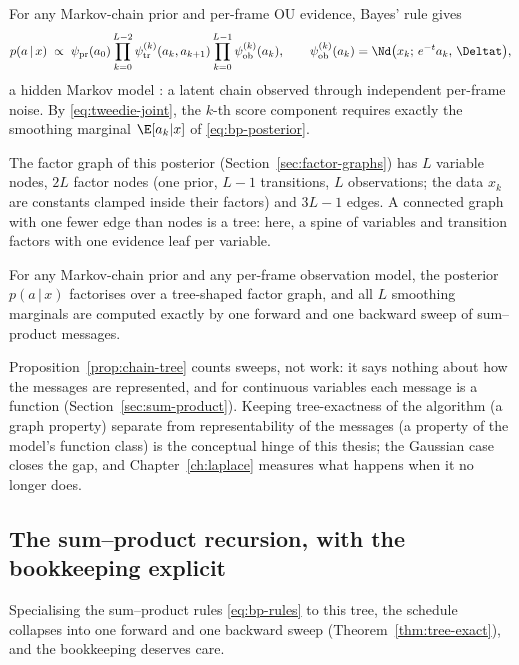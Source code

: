 For any Markov-chain prior and per-frame OU evidence, Bayes' rule gives
\begin{equation}
  p(a \,|\, x) \;\propto\;
  \psi_{\mathrm{pr}}(a_0)
  \prod_{k=0}^{L-2} \psi^{(k)}_{\mathrm{tr}}(a_k, a_{k+1})
  \prod_{k=0}^{L-1} \psi^{(k)}_{\mathrm{ob}}(a_k),
  \qquad
  \psi^{(k)}_{\mathrm{ob}}(a_k) = \Nd\big(x_k;\, e^{-t}a_k,\, \Deltat\big),
  \label{eq:bp-posterior}
\end{equation}
a hidden Markov model \citep{rabiner1989tutorial}: a latent chain observed
through independent per-frame noise. By \eqref{eq:tweedie-joint}, the
$k$-th score component requires exactly the smoothing marginal
$\E[a_k | x]$ of \eqref{eq:bp-posterior}.

The factor graph of this posterior (Section~\ref{sec:factor-graphs})
has $L$ variable nodes, $2L$
factor nodes (one prior, $L{-}1$ transitions, $L$ observations; the data
$x_k$ are constants clamped inside their factors) and $3L - 1$ edges. A
connected graph with one fewer edge than nodes is a tree: here, a spine of
variables and transition factors with one evidence leaf per variable.

\begin{proposition}\label{prop:chain-tree}
For any Markov-chain prior and any per-frame observation model, the
posterior $p(a \,|\, x)$ factorises over a tree-shaped factor graph, and
all $L$ smoothing marginals are computed exactly by one forward and one
backward sweep of sum--product messages.
\end{proposition}

Proposition~\ref{prop:chain-tree} counts sweeps, not work: it says
nothing about how the messages are represented, and for continuous
variables each message is a function
(Section~\ref{sec:sum-product}). Keeping tree-exactness of the
algorithm (a graph property) separate from representability of the
messages (a property of the model's function class) is the conceptual
hinge of this thesis; the Gaussian case closes the gap, and
Chapter~\ref{ch:laplace} measures what happens when it no longer does.

\subsection{The sum--product recursion, with the bookkeeping explicit}

Specialising the sum--product rules \eqref{eq:bp-rules} to this tree,
the schedule collapses into one forward and one backward sweep
(Theorem~\ref{thm:tree-exact}), and the bookkeeping deserves care.

